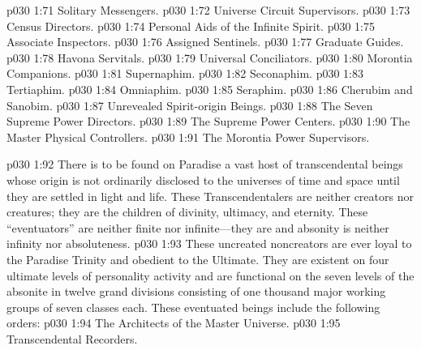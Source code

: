 \begin{ubquote}
\pc \vs p030 1:71 \bibnobreakspace Solitary Messengers.
\vs p030 1:72 \bibnobreakspace Universe Circuit Supervisors.
\vs p030 1:73 \bibnobreakspace Census Directors.
\vs p030 1:74 \bibnobreakspace Personal Aids of the Infinite Spirit.
\vs p030 1:75 \bibnobreakspace Associate Inspectors.
\vs p030 1:76 \bibnobreakspace Assigned Sentinels.
\vs p030 1:77 \bibnobreakspace Graduate Guides.
\vs p030 1:78 \bibnobreakspace Havona Servitals.
\vs p030 1:79 \bibnobreakspace Universal Conciliators.
\vs p030 1:80 \bibnobreakspace Morontia Companions.
\vs p030 1:81 \bibnobreakspace Supernaphim.
\vs p030 1:82 \bibnobreakspace Seconaphim.
\vs p030 1:83 \bibnobreakspace Tertiaphim.
\vs p030 1:84 \bibnobreakspace Omniaphim.
\vs p030 1:85 \bibnobreakspace Seraphim.
\vs p030 1:86 \bibnobreakspace Cherubim and Sanobim.
\vs p030 1:87 \bibnobreakspace Unrevealed Spirit\hyp{}origin Beings.
\vs p030 1:88 \bibnobreakspace The Seven Supreme Power Directors.
\vs p030 1:89 \bibnobreakspace The Supreme Power Centers.
\vs p030 1:90 \bibnobreakspace The Master Physical Controllers.
\vs p030 1:91 \bibnobreakspace The Morontia Power Supervisors.
\end{ubquote}
\pc \vs p030 1:92 \bibnobreakspace {} There is to be found on Paradise a vast host of transcendental beings whose origin is not ordinarily disclosed to the universes of time and space until they are settled in light and life. These Transcendentalers are neither creators nor creatures; they are the  children of divinity, ultimacy, and eternity. These “eventuators” are neither finite nor infinite---they are  and absonity is neither infinity nor absoluteness.
\vs p030 1:93 These uncreated noncreators are ever loyal to the Paradise Trinity and obedient to the Ultimate. They are existent on four ultimate levels of personality activity and are functional on the seven levels of the absonite in twelve grand divisions consisting of one thousand major working groups of seven classes each. These eventuated beings include the following orders:
\pc \vs p030 1:94 \bibnobreakspace The Architects of the Master Universe.
\vs p030 1:95 \bibnobreakspace Transcendental Recorders.
